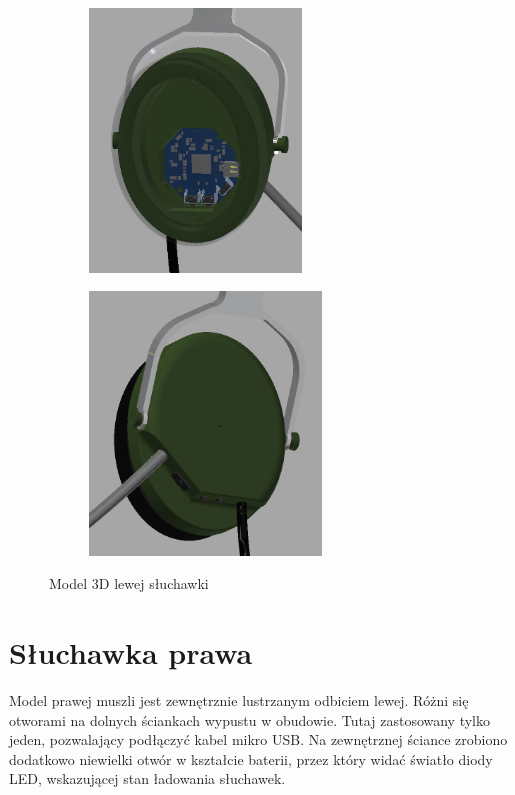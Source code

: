 \begin{figure}[H]
	\centering
	\begin{subfigure}{.45\textwidth}
		\centering
		\includegraphics[height=7cm]{zdjecia/model/left_in.png}
	\end{subfigure}
	\begin{subfigure}{.45\textwidth}
		\centering
		\includegraphics[height=7cm]{zdjecia/model/left_out.png}
	\end{subfigure}
	\caption{\label{pic:lewa_sluchawka} Model 3D lewej słuchawki}
\end{figure}


\section{Słuchawka prawa}
\label{cha:model_prawa}

Model prawej muszli jest zewnętrznie lustrzanym odbiciem lewej. Różni się otworami na dolnych ściankach wypustu w obudowie. Tutaj zastosowany tylko jeden, pozwalający podłączyć kabel mikro USB. Na zewnętrznej ściance zrobiono dodatkowo niewielki otwór w kształcie baterii, przez który widać światło diody LED, wskazującej stan ładowania słuchawek.

